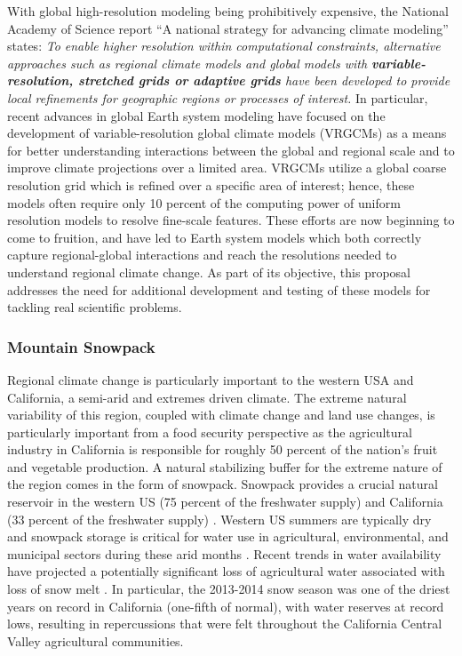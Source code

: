 \documentclass[11pt]{article}
\begin{document}
With global high-resolution modeling being prohibitively expensive, the National Academy of Science report ``A national strategy for advancing climate modeling'' states: \textit{To enable higher resolution within computational constraints, alternative approaches such as regional climate models and global models with \textbf{variable-resolution, stretched grids or adaptive grids} have been developed to provide local refinements for geographic regions or processes of interest.}  In particular, recent advances in global Earth system modeling have focused on the development of variable-resolution global climate models (VRGCMs) as a means for better understanding interactions between the global and regional scale and to improve climate projections over a limited area.  VRGCMs utilize a global coarse resolution grid which is refined over a specific area of interest; hence, these models often require only 10 percent of the computing power of uniform resolution models to resolve fine-scale features. These efforts are now beginning to come to fruition, and have led to Earth system models which both correctly capture regional-global interactions and reach the resolutions needed to understand regional climate change.   As part of its objective, this proposal addresses the need for additional development and testing of these models for tackling real scientific problems.

\subsubsection{Mountain Snowpack}

Regional climate change is particularly important to the western USA and California, a semi-arid and extremes driven climate.  The extreme natural variability of this region, coupled with climate change and land use changes, is particularly important from a food security perspective as the agricultural industry in California is responsible for roughly 50 percent of the nation's fruit and vegetable production.  A natural stabilizing buffer for the extreme nature of the region comes in the form of snowpack. Snowpack provides a crucial natural reservoir in the western US (75 percent of the freshwater supply) and California (33 percent of the freshwater supply) \citep{cayan1996interannual}.  Western US summers are typically dry and snowpack storage is critical for water use in agricultural, environmental, and municipal sectors during these arid months \citep{dettinger1995large, mote_declining_2005, maurer2007detection}.  Recent trends in water availability have projected a potentially significant loss of agricultural water associated with loss of snow melt \citep{dyer2006spatial}. In particular, the 2013-2014 snow season was one of the driest years on record in California (one-fifth of normal), with water reserves at record lows, resulting in repercussions that were felt throughout the California Central Valley agricultural communities.
\end{document}
